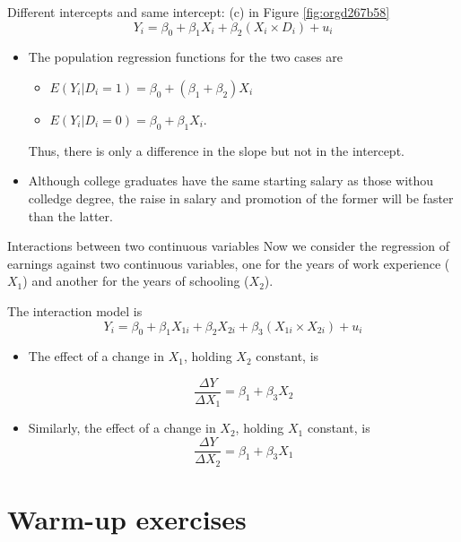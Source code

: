 \documentclass[presentation,10pt]{beamer}
\begin{document}
\begin{frame}[label={sec:org07c9b35}]{Different intercepts and same intercept: (c) in Figure \ref{fig:orgd267b58}}
\begin{equation}
\label{eq:interact-dx-c}
Y_i = \beta_0 + \beta_1 X_i + \beta_2 (X_i \times D_i) + u_i
\end{equation}

\begin{itemize}
\item The population regression functions for the two cases are
\begin{itemize}
\item \(E(Y_i|D_i=1) = \beta_0 + (\beta_1 + \beta_2) X_i\)
\item \(E(Y_i|D_i=0) = \beta_0 + \beta_1 X_i\).
\end{itemize}
Thus, there is only a difference in the slope but not in the
intercept.

\item Although college graduates have the same starting salary as those
withou colledge degree, the raise in salary and promotion of the
former will be faster than the latter.
\end{itemize}
\end{frame}

\begin{frame}[label={sec:org7c9c304}]{Interactions between two continuous variables}
Now we consider the regression of earnings against two continuous
variables, one for the years of work experience (\(X_1\)) and another
for the years of schooling (\(X_2\)).

\vspace{0.2cm}
The interaction model is
\begin{equation}
\label{eq:interact-xx}
Y_i = \beta_0 + \beta_1 X_{1i} + \beta_2 X_{2i} + \beta_3 (X_{1i} \times X_{2i}) + u_i
\end{equation}
\begin{itemize}
\item The effect of a change in \(X_1\), holding \(X_2\) constant, is

\[ \frac{\Delta Y}{\Delta X_1} = \beta_1 + \beta_3 X_2 \]
\item Similarly, the effect of a change in \(X_2\), holding \(X_1\) constant, is
\[ \frac{\Delta Y}{\Delta X_2} = \beta_1 + \beta_3 X_1 \]
\end{itemize}
\end{frame}


\section{Warm-up exercises}
\label{sec:org0381032}
\end{document}
